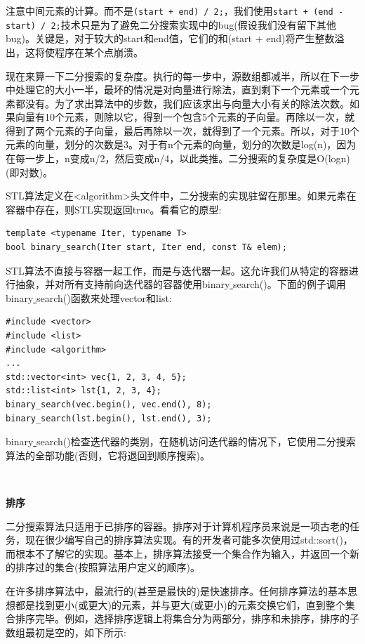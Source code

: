 注意中间元素的计算。而不是\texttt{(start + end) / 2;}，我们使用\texttt{start + (end - start) / 2;}技术只是为了避免二分搜索实现中的bug(假设我们没有留下其他bug)。关键是，对于较大的start和end值，它们的和(start + end)将产生整数溢出，这将使程序在某个点崩溃。 \par
现在来算一下二分搜索的复杂度。执行的每一步中，源数组都减半，所以在下一步中处理它的大小一半，最坏的情况是对向量进行除法，直到剩下一个元素或一个元素都没有。为了求出算法中的步数，我们应该求出与向量大小有关的除法次数。如果向量有10个元素，则除以它，得到一个包含5个元素的子向量。再除以一次，就得到了两个元素的子向量，最后再除以一次，就得到了一个元素。所以，对于10个元素的向量，划分的次数是3。对于有n个元素的向量，划分的次数是log(n)，因为在每一步上，n变成n/2，然后变成n/4，以此类推。二分搜索的复杂度是O(logn)(即对数)。 \par
STL算法定义在<algorithm>头文件中，二分搜索的实现驻留在那里。如果元素在容器中存在，则STL实现返回true。看看它的原型: \par

\begin{lstlisting}[caption={}]
template <typename Iter, typename T>
bool binary_search(Iter start, Iter end, const T& elem);
\end{lstlisting}

STL算法不直接与容器一起工作，而是与迭代器一起。这允许我们从特定的容器进行抽象，并对所有支持前向迭代器的容器使用binary\underline{ }search()。下面的例子调用binary\underline{ }search()函数来处理vector和list: \par

\begin{lstlisting}[caption={}]
#include <vector>
#include <list>
#include <algorithm>
...
std::vector<int> vec{1, 2, 3, 4, 5};
std::list<int> lst{1, 2, 3, 4};
binary_search(vec.begin(), vec.end(), 8);
binary_search(lst.begin(), lst.end(), 3);
\end{lstlisting}

binary\underline{ }search()检查迭代器的类别，在随机访问迭代器的情况下，它使用二分搜索算法的全部功能(否则，它将退回到顺序搜索)。 \par

\noindent\textbf{}\ \par
\textbf{排序} \ \par
二分搜索算法只适用于已排序的容器。排序对于计算机程序员来说是一项古老的任务，现在很少编写自己的排序算法实现。有的开发者可能多次使用过std::sort()，而根本不了解它的实现。基本上，排序算法接受一个集合作为输入，并返回一个新的排序过的集合(按照算法用户定义的顺序)。 \par
在许多排序算法中，最流行的(甚至是最快的)是快速排序。任何排序算法的基本思想都是找到更小(或更大)的元素，并与更大(或更小)的元素交换它们，直到整个集合排序完毕。例如，选择排序逻辑上将集合分为两部分，排序和未排序，排序的子数组最初是空的，如下所示: \par

